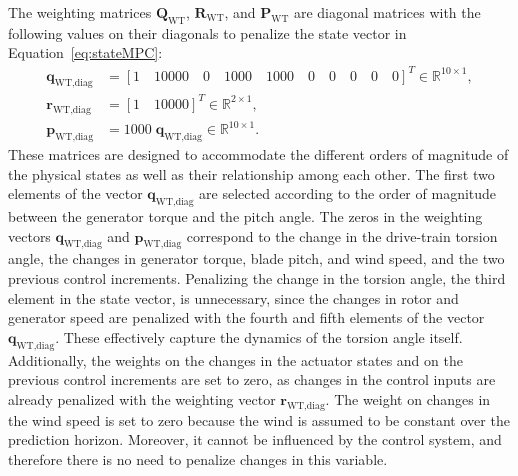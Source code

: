 The weighting matrices \( \bm{Q}_{\text{WT}} \), \( \bm{R}_{\text{WT}} \), and \( \bm{P}_{\text{WT}} \) are diagonal matrices with the following values on their diagonals to penalize the state vector in Equation~\eqref{eq:stateMPC}:
\begin{align}
    \bm{q}_{\text{WT,diag}} &= [1 \quad 10000 \quad 0 \quad 1000 \quad 1000 \quad 0 \quad 0 \quad 0 \quad 0 \quad 0]^T \in \mathbb{R}^{10 \times 1}, \\
    \bm{r}_{\text{WT,diag}} &= [1 \quad 10000]^T \in \mathbb{R}^{2 \times 1}, \\
    \bm{p}_{\text{WT,diag}} &= 1000 \; \bm{q}_{\text{WT,diag}} \in \mathbb{R}^{10 \times 1}.
\end{align}
%
These matrices are designed to accommodate the different orders of magnitude of the physical states as well as their relationship among each other. The first two elements of the vector $\bm{q}_{\text{WT,diag}}$ are selected according to the order of magnitude between the generator torque and the pitch angle. The zeros in the weighting vectors $\bm{q}_{\text{WT,diag}}$ and $\bm{p}_{\text{WT,diag}}$ correspond to the change in the drive-train torsion angle, the changes in generator torque, blade pitch, and wind speed, and the two previous control increments. Penalizing the change in the torsion angle, the third element in the state vector, is unnecessary, since the changes in rotor and generator speed are penalized with the fourth and fifth elements of the vector $\bm{q}_{\text{WT,diag}}$. These effectively capture the dynamics of the torsion angle itself. Additionally, the weights on the changes in the actuator states and on the previous control increments are set to zero, as changes in the control inputs are already penalized with the weighting vector $\bm{r}_{\text{WT,diag}}$. The weight on changes in the wind speed is set to zero because the wind is assumed to be constant over the prediction horizon. Moreover, it cannot be influenced by the control system, and therefore there is no need to penalize changes in this variable.

